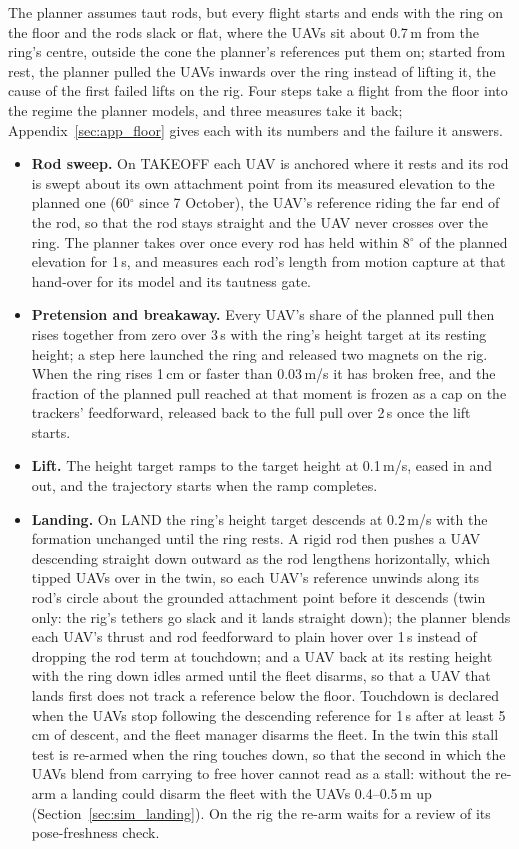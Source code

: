 The planner assumes taut rods, but every flight starts and ends with the ring on the floor and the rods slack or
flat, where the UAVs sit about 0.7\,m from the ring's centre, outside the cone the planner's references put them
on; started from rest, the planner pulled the UAVs inwards over the ring instead of lifting it, the cause of the
first failed lifts on the rig. Four steps take a flight from the floor into the regime the planner models, and three
measures take it back; Appendix~\ref{sec:app_floor} gives each with its numbers and the failure it answers.
\begin{itemize}
    \item \textbf{Rod sweep.} On TAKEOFF each UAV is anchored where it rests and its rod is swept about its own
    attachment point from its measured elevation to the planned one (60$^\circ$ since 7 October), the UAV's
    reference riding the far end of the rod, so that the rod stays straight and the UAV never crosses over the
    ring. The planner takes over once every rod has held within 8$^\circ$ of the planned elevation for 1\,s, and
    measures each rod's length from motion capture at that hand-over for its model and its tautness gate.
    \item \textbf{Pretension and breakaway.} Every UAV's share of the planned pull then rises together from zero
    over 3\,s with the ring's height target at its resting height; a step here launched the ring and released two
    magnets on the rig. When the ring rises 1\,cm or faster than 0.03\,m/s it has broken free, and the fraction of
    the planned pull reached at that moment is frozen as a cap on the trackers' feedforward, released back to the
    full pull over 2\,s once the lift starts.
    \item \textbf{Lift.} The height target ramps to the target height at 0.1\,m/s, eased in and out, and the
    trajectory starts when the ramp completes.
    \item \textbf{Landing.} On LAND the ring's height target descends at 0.2\,m/s with the formation unchanged
    until the ring rests. A rigid rod then pushes a UAV descending straight down outward as the rod lengthens
    horizontally, which tipped UAVs over in the twin, so each UAV's reference unwinds along its rod's circle about
    the grounded attachment point before it descends (twin only: the rig's tethers go slack and it lands straight
    down); the planner blends each UAV's thrust and rod feedforward to plain hover over 1\,s instead of dropping
    the rod term at touchdown; and a UAV back at its resting height with the ring down idles armed until the fleet
    disarms, so that a UAV that lands first does not track a reference below the floor. Touchdown is declared when
    the UAVs stop following the descending reference for 1\,s after at least 5\,cm of descent, and the fleet
    manager disarms the fleet. In the twin this stall test is re-armed when the ring touches down, so that the
    second in which the UAVs blend from carrying to free hover cannot read as a stall: without the re-arm a
    landing could disarm the fleet with the UAVs 0.4--0.5\,m up (Section~\ref{sec:sim_landing}). On the rig the
    re-arm waits for a review of its pose-freshness check.
\end{itemize}
